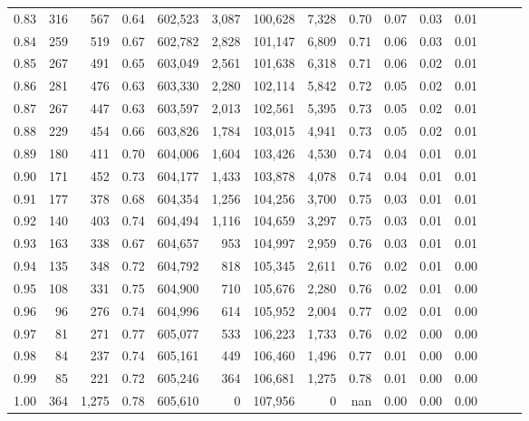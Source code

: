 \begin{tabular}{rrrrrrrrrrrrrrr}
0.83 &     316 &    567 &  0.64 &  602,523 &    3,087 &  100,628 &    7,328 &  0.70 &  0.07 &  0.03 &      0.01 \\
0.84 &     259 &    519 &  0.67 &  602,782 &    2,828 &  101,147 &    6,809 &  0.71 &  0.06 &  0.03 &      0.01 \\
0.85 &     267 &    491 &  0.65 &  603,049 &    2,561 &  101,638 &    6,318 &  0.71 &  0.06 &  0.02 &      0.01 \\
0.86 &     281 &    476 &  0.63 &  603,330 &    2,280 &  102,114 &    5,842 &  0.72 &  0.05 &  0.02 &      0.01 \\
0.87 &     267 &    447 &  0.63 &  603,597 &    2,013 &  102,561 &    5,395 &  0.73 &  0.05 &  0.02 &      0.01 \\
0.88 &     229 &    454 &  0.66 &  603,826 &    1,784 &  103,015 &    4,941 &  0.73 &  0.05 &  0.02 &      0.01 \\
0.89 &     180 &    411 &  0.70 &  604,006 &    1,604 &  103,426 &    4,530 &  0.74 &  0.04 &  0.01 &      0.01 \\
0.90 &     171 &    452 &  0.73 &  604,177 &    1,433 &  103,878 &    4,078 &  0.74 &  0.04 &  0.01 &      0.01 \\
0.91 &     177 &    378 &  0.68 &  604,354 &    1,256 &  104,256 &    3,700 &  0.75 &  0.03 &  0.01 &      0.01 \\
0.92 &     140 &    403 &  0.74 &  604,494 &    1,116 &  104,659 &    3,297 &  0.75 &  0.03 &  0.01 &      0.01 \\
0.93 &     163 &    338 &  0.67 &  604,657 &      953 &  104,997 &    2,959 &  0.76 &  0.03 &  0.01 &      0.01 \\
0.94 &     135 &    348 &  0.72 &  604,792 &      818 &  105,345 &    2,611 &  0.76 &  0.02 &  0.01 &      0.00 \\
0.95 &     108 &    331 &  0.75 &  604,900 &      710 &  105,676 &    2,280 &  0.76 &  0.02 &  0.01 &      0.00 \\
0.96 &      96 &    276 &  0.74 &  604,996 &      614 &  105,952 &    2,004 &  0.77 &  0.02 &  0.01 &      0.00 \\
0.97 &      81 &    271 &  0.77 &  605,077 &      533 &  106,223 &    1,733 &  0.76 &  0.02 &  0.00 &      0.00 \\
0.98 &      84 &    237 &  0.74 &  605,161 &      449 &  106,460 &    1,496 &  0.77 &  0.01 &  0.00 &      0.00 \\
0.99 &      85 &    221 &  0.72 &  605,246 &      364 &  106,681 &    1,275 &  0.78 &  0.01 &  0.00 &      0.00 \\
1.00 &     364 &  1,275 &  0.78 &  605,610 &        0 &  107,956 &        0 &   nan &  0.00 &  0.00 &      0.00 \\
\bottomrule
\end{tabular}
